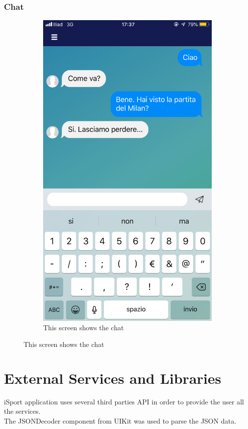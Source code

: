 \documentclass[numbers=noenddot, 12pt, a4paper, oneside]{scrbook}
\begin{document}
\subsection*{Chat}
\begin{figure}[H]
	\centering
	\begin{subfigure}{.5\textwidth}
		\centering
		\includegraphics[width=.8\linewidth]{images/Screen/Chat}
		\caption{This screen shows the chat}
	\end{subfigure}
\end{figure}


\chapter{External Services and Libraries}
iSport application uses several third parties API in order to provide the user all the services.\\
The JSONDecoder component from UIKit was used to parse the JSON data.
\end{document}
